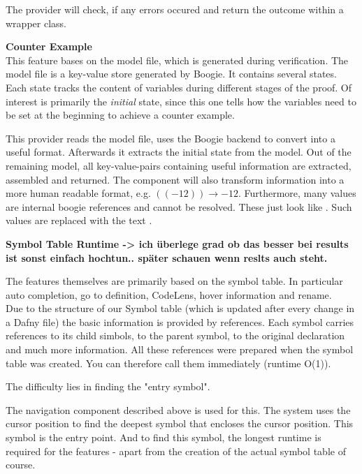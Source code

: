 The provider will check, if any errors occured and return the outcome within a wrapper class.

\textbf{Counter Example}\\
This feature bases on the model file, which is generated during verification. The model file is a key-value store generated by Boogie. It contains several states. Each state tracks the content of variables during different stages of the proof. Of interest is primarily the \textit{initial} state, since this one tells how the variables need to be set at the beginning to achieve a counter example.

This provider reads the model file, uses the Boogie backend to convert into a useful format. Afterwards it extracts the initial state from the model. Out of the remaining model, all key-value-pairs containing useful information are extracted, assembled and returned. The component will also transform information into a more human readable format, e.g. $((- 12)) \rightarrow -12$. Furthermore, many values are internal boogie references and cannot be resolved. These just look like . Such values are replaced with the text .











\textbf{Symbol Table Runtime -> ich überlege grad ob das besser bei results ist sonst einfach hochtun.. später schauen wenn reslts auch steht.}

The features themselves are primarily based on the symbol table.
In particular auto completion, go to definition, CodeLens, hover information and rename. \\

Due to the structure of our Symbol table (which is updated after every change in a Dafny file)
the basic information is provided by references.
Each symbol carries references to its child simbols, to the parent symbol, to the original declaration and much more information.
All these references were prepared when the symbol table was created. You can therefore call them immediately (runtime O(1)).  

The difficulty lies in finding the "entry symbol".

The navigation component described above is used for this. The system uses the cursor position to find the deepest symbol that encloses the cursor position. This symbol is the entry point. And to find this symbol, the longest runtime is required for the features - apart from the creation of the actual symbol table of course.


